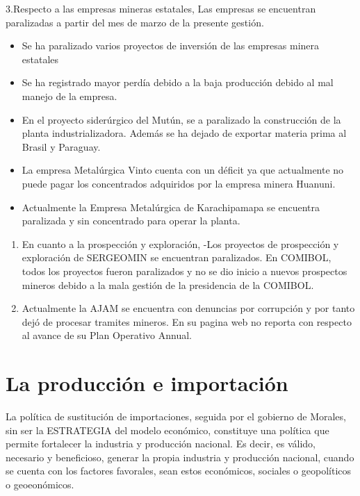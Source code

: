 \documentclass[a4paper, nobind]{templates/ociamthesis}
\providecommand{\tightlist}{%
  \setlength{\itemsep}{0pt}\setlength{\parskip}{0pt}}
\begin{document}
3.Respecto a las empresas mineras estatales, Las empresas se encuentran paralizadas a partir del mes de marzo de la presente gestión.

\begin{itemize}
\tightlist
\item
  Se ha paralizado varios proyectos de inversión de las empresas minera estatales
\item
  Se ha registrado mayor perdía debido a la baja producción debido al mal manejo de la empresa.
\item
  En el proyecto siderúrgico del Mutún, se a paralizado la construcción de la planta industrializadora. Además se ha dejado de exportar materia prima al Brasil y Paraguay.
\item
  La empresa Metalúrgica Vinto cuenta con un déficit ya que actualmente no puede pagar los concentrados adquiridos por la empresa minera Huanuni.
\item
  Actualmente la Empresa Metalúrgica de Karachipamapa se encuentra paralizada y sin concentrado para operar la planta.
\end{itemize}

\begin{enumerate}
\def\labelenumi{\arabic{enumi}.}
\setcounter{enumi}{3}
\item
  En cuanto a la prospección y exploración, -Los proyectos de prospección y exploración de SERGEOMIN se encuentran paralizados. En COMIBOL, todos los proyectos fueron paralizados y no se dio inicio a nuevos prospectos mineros debido a la mala gestión de la presidencia de la COMIBOL.
\item
  Actualmente la AJAM se encuentra con denuncias por corrupción y por tanto dejó de procesar tramites mineros. En su pagina web no reporta con respecto al avance de su Plan Operativo Annual.
\end{enumerate}

\hypertarget{la-producciuxf3n-e-importaciuxf3n}{%
\chapter{La producción e importación}\label{la-producciuxf3n-e-importaciuxf3n}}

La política de sustitución de importaciones, seguida por el gobierno de Morales, sin ser la ESTRATEGIA del modelo económico, constituye una política que permite fortalecer la industria y producción nacional. Es decir, es válido, necesario y beneficioso, generar la propia industria y producción nacional, cuando se cuenta con los factores favorales, sean estos económicos, sociales o geopolíticos o geoeonómicos.
\end{document}
